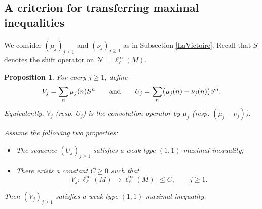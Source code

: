 \documentclass[12pt]{amsart}
\newcommand{\N}{\mbox{${\mathcal N}$}}
\newcommand{\bignorm}[1]{\bigl\Vert#1\bigr\Vert}
\newtheorem{proposition}[theorem]{Proposition}
\theoremstyle{remark}
\theoremstyle{definition}
\numberwithin{equation}{section}
\begin{document}
\subsection{A criterion for transferring maximal inequalities}\label{Criterion}

We consider $(\mu_j)_{j\geq 1}$ and $(\nu_j)_{j\geq 1}$ as in Subsection \ref{LaVictoire}. Recall that $S$ denotes the shift operator on $\N=\ell^\infty_{\mathbb Z}(M)$.

\begin{proposition}\label{4Main}
For every $j\ge 1$, define
$$
V_j = \sum_{n} \mu_j(n) S^n 
\qquad\hbox{and}\qquad
U_j =  \sum_{n} \bigl(\mu_j(n) -\nu_j(n)\bigr)S^n.
$$
Equivalently, $V_j$ (resp. $U_j$) is the convolution operator by $\mu_j$ (resp. $(\mu_j-\nu_j)$).

Assume the following two properties:
\begin{itemize}
\item [(H1)] The sequence $(U_j)_{j\ge1}$ satisfies a weak-type
$(1,1)$-maximal inequality;
\item [(H2)] There exists a constant $C\geq 0$ such that 
$$
\bignorm{V_j\colon \ell^\infty_{\mathbb Z}(M)\longrightarrow
\ell^\infty_{\mathbb Z}(M)}\leq C,\qquad j\geq 1.
$$
\end{itemize}
Then $(V_j)_{j\ge1}$ satisfies a weak type $(1,1)$-maximal inequality.
\end{proposition}
\end{document}
